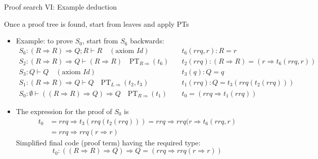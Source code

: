 \documentclass[english]{beamer}
\begin{document}
\begin{frame}{Proof search VI: Example deduction}

Once a proof tree is found, start from leaves and apply PTs
\begin{itemize}
\item Example: to prove $S_{0}$, start from $S_{6}$ backwards:{\footnotesize{}
\begin{align*}
S_{6}:\left(R\Rightarrow R\right)\Rightarrow Q;R\vdash R\quad(\text{axiom }Id)\quad & t_{6}(rrq,r):R=r\\
S_{2}:\left(R\Rightarrow R\right)\Rightarrow Q\vdash\left(R\Rightarrow R\right)\quad\text{PT}_{R\Rightarrow}(t_{6})\quad & t_{2}(rrq):\left(R\Rightarrow R\right)=\left(r\Rightarrow t_{6}(rrq,r)\right)\\
S_{3}:Q\vdash Q\quad(\text{axiom }Id)\quad & t_{3}(q):Q=q\\
S_{1}:\left(R\Rightarrow R\right)\Rightarrow Q\vdash Q\quad\text{PT}_{L\Rightarrow}(t_{2},t_{3})\quad & t_{1}(rrq):Q=t_{3}(rrq(t_{2}(rrq)))\\
S_{0}:\emptyset\vdash\left(\left(R\Rightarrow R\right)\Rightarrow Q\right)\Rightarrow Q\quad\text{PT}_{R\Rightarrow}(t_{1})\quad & t_{0}=\left(rrq\Rightarrow t_{1}(rrq)\right)
\end{align*}
}{\footnotesize \par}
\item The expression for the proof of $S_{0}$ is
\begin{align*}
t_{0} & =rrq\Rightarrow t_{3}\left(rrq\left(t_{2}\left(rrq\right)\right)\right)=rrq\Rightarrow rrq(r\Rightarrow t_{6}\left(rrq,r\right)\\
 & =rrq\Rightarrow rrq\left(r\Rightarrow r\right)
\end{align*}
Simplified final code (proof term) having the required type: 
\[
t_{0}:\left(\left(R\Rightarrow R\right)\Rightarrow Q\right)\Rightarrow Q=\left(rrq\Rightarrow rrq\left(r\Rightarrow r\right)\right)
\]
\end{itemize}
\end{frame}
\end{document}
